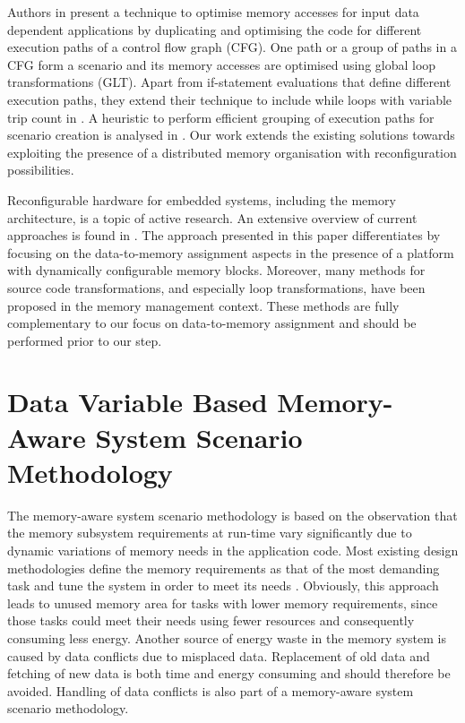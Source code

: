 Authors in \cite{Pal06} present a technique to optimise memory accesses for input data dependent applications by duplicating and optimising the code for different execution paths of a control flow graph (CFG). 
One path or a group of paths in a CFG form a scenario and its memory accesses are optimised using global loop transformations (GLT). 
Apart from if-statement evaluations that define different execution paths, they extend their technique to include while loops with variable trip count in \cite{Pal06b}. 
A heuristic to perform efficient grouping of execution paths for scenario creation is analysed in \cite{Pal07}. 
Our work extends the existing solutions towards exploiting the presence of a distributed memory organisation with reconfiguration possibilities.

Reconfigurable hardware for embedded systems, including the memory architecture, is a topic of active research. 
An extensive overview of current approaches is found in \cite{Garcia}. 
The approach presented in this paper differentiates by focusing on the data-to-memory assignment aspects in the presence of a platform with dynamically configurable memory blocks. 
Moreover, many methods for source code transformations, and especially loop transformations, have been proposed in the memory management context. 
These methods are fully complementary to our focus on data-to-memory assignment and should be performed prior to our step. 

\section{Data Variable Based Memory-Aware System Scenario Methodology}
\label{sec:methodologyC}

The memory-aware system scenario methodology is based on the observation that the memory subsystem requirements at run-time vary significantly due to dynamic variations of memory needs in the application code. 
Most existing design methodologies define the memory requirements as that of the most demanding task and tune the system in order to meet its needs \cite{tcm}. 
Obviously, this approach leads to unused memory area for tasks with lower memory requirements, since those tasks could meet their needs using fewer resources and consequently consuming less energy. 
Another source of energy waste in the memory system is caused by data conflicts due to misplaced data. 
Replacement of old data and fetching of new data is both time and energy consuming and should therefore be avoided. 
Handling of data conflicts is also part of a memory-aware system scenario methodology.

